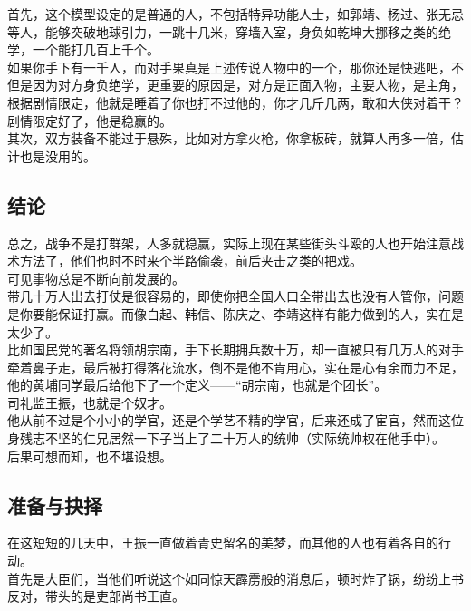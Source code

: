 \begin{multicols}{\theparacolNo}
首先，这个模型设定的是普通的人，不包括特异功能人士，如郭靖、杨过、张无忌等人，能够突破地球引力，一跳十几米，穿墙入室，身负如乾坤大挪移之类的绝学，一个能打几百上千个。\\

如果你手下有一千人，而对手果真是上述传说人物中的一个，那你还是快逃吧，不但是因为对方身负绝学，更重要的原因是，对方是正面入物，主要人物，是主角，根据剧情限定，他就是睡着了你也打不过他的，你才几斤几两，敢和大侠对着干？剧情限定好了，他是稳赢的。\\

其次，双方装备不能过于悬殊，比如对方拿火枪，你拿板砖，就算人再多一倍，估计也是没用的。\\

\subsection{结论}
总之，战争不是打群架，人多就稳赢，实际上现在某些街头斗殴的人也开始注意战术方法了，他们也时不时来个半路偷袭，前后夹击之类的把戏。\\

可见事物总是不断向前发展的。\\

带几十万人出去打仗是很容易的，即使你把全国人口全带出去也没有人管你，问题是你要能保证打赢。而像白起、韩信、陈庆之、李靖这样有能力做到的人，实在是太少了。\\

比如国民党的著名将领胡宗南，手下长期拥兵数十万，却一直被只有几万人的对手牵着鼻子走，最后被打得落花流水，倒不是他不肯用心，实在是心有余而力不足，他的黄埔同学最后给他下了一个定义——“胡宗南，也就是个团长”。\\

司礼监王振，也就是个奴才。\\

他从前不过是个小小的学官，还是个学艺不精的学官，后来还成了宦官，然而这位身残志不坚的仁兄居然一下子当上了二十万人的统帅（实际统帅权在他手中）。\\

后果可想而知，也不堪设想。\\

\subsection{准备与抉择}
在这短短的几天中，王振一直做着青史留名的美梦，而其他的人也有着各自的行动。\\

首先是大臣们，当他们听说这个如同惊天霹雳般的消息后，顿时炸了锅，纷纷上书反对，带头的是吏部尚书王直。\\


\end{multicols}
